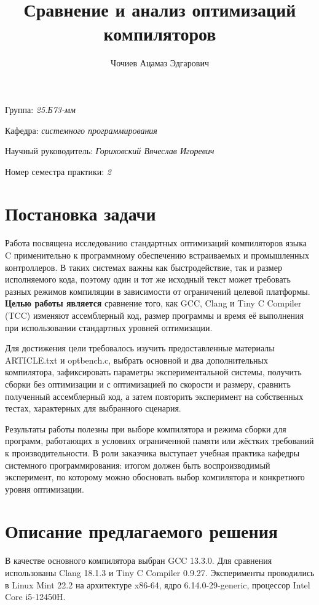 \documentclass[a4paper]{article}
\title{Сравнение и анализ оптимизаций компиляторов}
\author{Чочиев Ацамаз Эдгарович}
\date{}
\begin{document}
\maketitle

\begin{flushright}
    Группа: \emph{25.Б73-мм}

    Кафедра: \emph{системного программирования}

    Научный руководитель: \emph{Гориховский Вячеслав Игоревич}

    Номер семестра практики: \emph{2}
\end{flushright}

\section{Постановка задачи}

Работа посвящена исследованию стандартных оптимизаций компиляторов языка C применительно к программному обеспечению встраиваемых и промышленных контроллеров. В таких системах важны как быстродействие, так и размер исполняемого кода, поэтому один и тот же исходный текст может требовать разных режимов компиляции в зависимости от ограничений целевой платформы. \textbf{Целью работы является} сравнение того, как GCC, Clang и Tiny C Compiler (TCC) изменяют ассемблерный код, размер программы и время её выполнения при использовании стандартных уровней оптимизации.

Для достижения цели требовалось изучить предоставленные материалы ARTICLE.txt и optbench.c, выбрать основной и два дополнительных компилятора, зафиксировать параметры экспериментальной системы, получить сборки без оптимизации и с оптимизацией по скорости и размеру, сравнить полученный ассемблерный код, а затем повторить эксперимент на собственных тестах, характерных для выбранного сценария.

Результаты работы полезны при выборе компилятора и режима сборки для программ, работающих в условиях ограниченной памяти или жёстких требований к производительности. В роли заказчика выступает учебная практика кафедры системного программирования: итогом должен быть воспроизводимый эксперимент, по которому можно обосновать выбор компилятора и конкретного уровня оптимизации.

\section{Описание предлагаемого решения}

В качестве основного компилятора выбран GCC 13.3.0. Для сравнения использованы Clang 18.1.3 и Tiny C Compiler 0.9.27. Эксперименты проводились в Linux Mint 22.2 на архитектуре x86-64, ядро 6.14.0-29-generic, процессор Intel Core i5-12450H.
\end{document}
